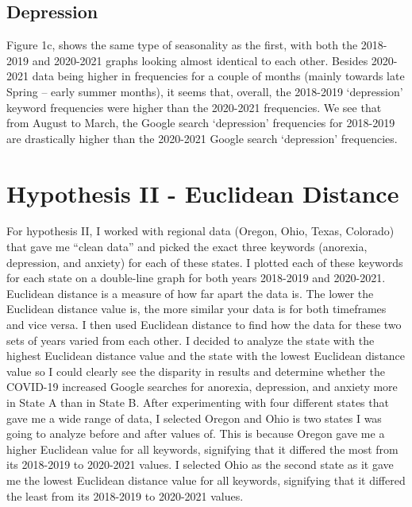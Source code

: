 \documentclass{article}
\begin{document}
\subsection{Depression}

Figure 1c, shows the same type of seasonality as the first, with both the 2018-2019 and 2020-2021
graphs looking almost identical to each other. Besides 2020-2021 data being higher in frequencies for
a couple of months (mainly towards late Spring – early summer months), it seems that, overall, the
2018-2019 ‘depression’ keyword frequencies were higher than the 2020-2021 frequencies. We see
that from August to March, the Google search ‘depression’ frequencies for 2018-2019 are drastically
higher than the 2020-2021 Google search ‘depression’ frequencies.

\section{Hypothesis II - Euclidean Distance }

For hypothesis II, I worked with regional data (Oregon, Ohio, Texas, Colorado) that gave me “clean
data” and picked the exact three keywords (anorexia, depression, and anxiety) for each of these
states. I plotted each of these keywords for each state on a double-line graph for both years
2018-2019 and 2020-2021. Euclidean distance is a measure of how far apart the data is. The lower
the Euclidean distance value is, the more similar your data is for both timeframes and vice versa. I
then used Euclidean distance to find how the data for these two sets of years varied from each other. I
decided to analyze the state with the highest Euclidean distance value and the state with the lowest
Euclidean distance value so I could clearly see the disparity in results and determine whether the
COVID-19 increased Google searches for anorexia, depression, and anxiety more in State A than in
State B.
After experimenting with four different states that gave me a wide range of data, I selected Oregon and
Ohio is two states I was going to analyze before and after values of. This is because Oregon gave me
a higher Euclidean value for all keywords, signifying that it differed the most from its 2018-2019 to
2020-2021 values. I selected Ohio as the second state as it gave me the lowest Euclidean distance
value for all keywords, signifying that it differed the least from its 2018-2019 to 2020-2021 values.
\end{document}
